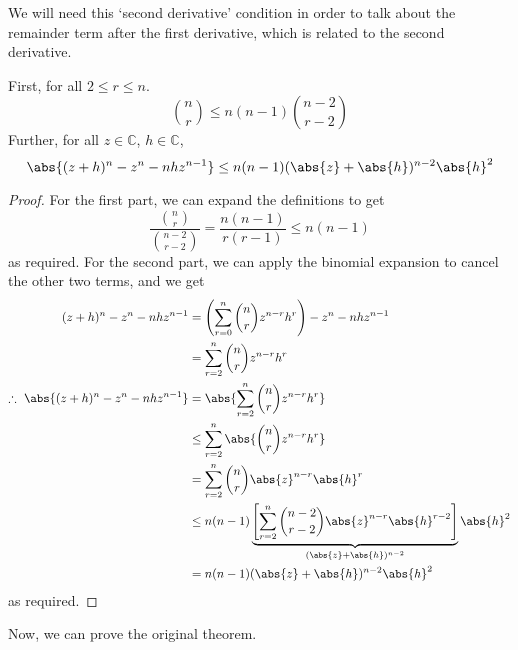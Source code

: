 We will need this `second derivative' condition in order to talk about the remainder term after the first derivative, which is related to the second derivative.
\begin{lemma}
	First, for all \(2 \leq r \leq n\).
	\[
		\binom{n}{r} \leq n(n-1)\binom{n-2}{r-2}
	\]
	Further, for all \(z \in \mathbb C\), \(h \in \mathbb C\),
	\[
		\abs{(z + h)^n - z^n - nhz^{n-1}} \leq n(n-1)(\abs{z} + \abs{h})^{n-2}\abs{h}^2
	\]
\end{lemma}
\begin{proof}
	For the first part, we can expand the definitions to get
	\[
		\frac{\binom{n}{r}}{\binom{n-2}{r-2}} = \frac{n(n-1)}{r(r-1)} \leq n(n-1)
	\]
	as required.
	For the second part, we can apply the binomial expansion to cancel the other two terms, and we get
	\begin{align*}
		(z + h)^n - z^n - nhz^{n-1}                  & = \left( \sum_{r=0}^n \binom{n}{r} z^{n-r} h^r \right)  - z^n - nhz^{n-1}                                                               \\
		                                             & = \sum_{r=2}^n \binom{n}{r} z^{n-r} h^r                                                                                                 \\
		\therefore\ \abs{(z + h)^n - z^n - nhz^{n-1}} & = \abs{\sum_{r=2}^n \binom{n}{r} z^{n-r} h^r}                                                                                           \\
		                                             & \leq \sum_{r=2}^n \abs{\binom{n}{r} z^{n-r} h^r}                                                                                        \\
		                                             & = \sum_{r=2}^n \binom{n}{r} \abs{z}^{n-r} \abs{h}^r                                                                                     \\
		                                             & \leq n(n-1) \underbrace{\left[ \sum_{r=2}^n \binom{n-2}{r-2} \abs{z}^{n-r} \abs{h}^{r-2} \right]}_{(\abs{z} + \abs{h})^{n-2}} \abs{h}^2 \\
		                                             & = n(n-1) (\abs{z} + \abs{h})^{n-2} \abs{h}^2                                                                                            \\
	\end{align*}
	as required.
\end{proof}
Now, we can prove the original theorem.
